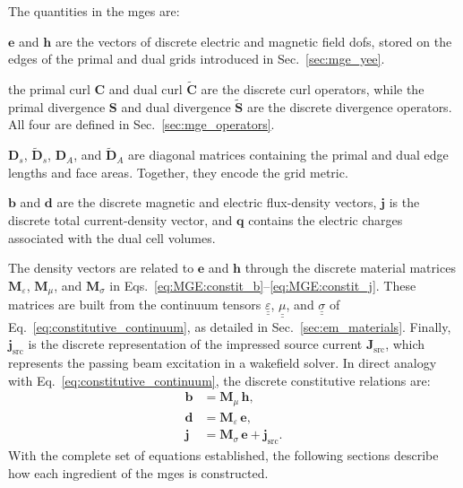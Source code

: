 The quantities in the \glspl{mge} are:
\begin{mydescription}
\item[Field vectors:] $\mathbf{e}$ and $\mathbf{h}$ are the vectors of discrete electric and magnetic field \glspl{dof}, stored on the
edges of the primal and dual grids introduced in Sec.~\ref{sec:mge_yee}.
\item[Topological operators:] the primal curl $\mathbf{C}$ and dual curl $\widetilde{\mathbf{C}}$ are the discrete curl operators, while
the primal divergence $\mathbf{S}$ and dual divergence $\widetilde{\mathbf{S}}$ are the discrete divergence operators. All four are defined in Sec.~\ref{sec:mge_operators}.
\item[Metric matrices:] $\mathbf{D}_s$, $\widetilde{\mathbf{D}}_s$, $\mathbf{D}_A$, and $\widetilde{\mathbf{D}}_A$ are diagonal matrices
containing the primal and dual edge lengths and face areas. Together, they encode the grid metric.
\item[Density and charge vectors:] $\mathbf{b}$ and $\mathbf{d}$ are the discrete magnetic and electric flux-density vectors,
$\mathbf{j}$ is the discrete total current-density vector, and $\mathbf{q}$ contains the electric charges associated with the dual cell volumes.
\end{mydescription}

The density vectors are related to $\mathbf{e}$ and $\mathbf{h}$ through the discrete material matrices $\mathbf{M}_\varepsilon$, $\mathbf{M}_\mu$, and $\mathbf{M}_\sigma$ in Eqs.~\eqref{eq:MGE:constit_b}--\eqref{eq:MGE:constit_j}. These matrices are built from the continuum tensors $\underline{\underline{\varepsilon}}$, $\underline{\underline{\mu}}$, and $\underline{\underline{\sigma}}$ of Eq.~\eqref{eq:constitutive_continuum}, as detailed in Sec.~\ref{sec:em_materials}. Finally, $\mathbf{j}_{\mathrm{src}}$ is the discrete representation of the impressed source current $\mathbf{J}_{\mathrm{src}}$, which represents the passing beam excitation in a wakefield solver. In direct analogy with Eq.~\eqref{eq:constitutive_continuum}, the discrete constitutive relations are:
%
\begin{align}
\mathbf{b} &= \mathbf{M}_{\mu}\,\mathbf{h}, \label{eq:MGE:constit_b}\\
\mathbf{d} &= \mathbf{M}_{\varepsilon}\,\mathbf{e}, \label{eq:MGE:constit_d}\\
\mathbf{j} &= \mathbf{M}_{\sigma}\,\mathbf{e} + \mathbf{j}_{\mathrm{src}}. \label{eq:MGE:constit_j}
\end{align}
%
With the complete set of equations established, the following sections describe how each ingredient of the \glspl{mge} is constructed.

